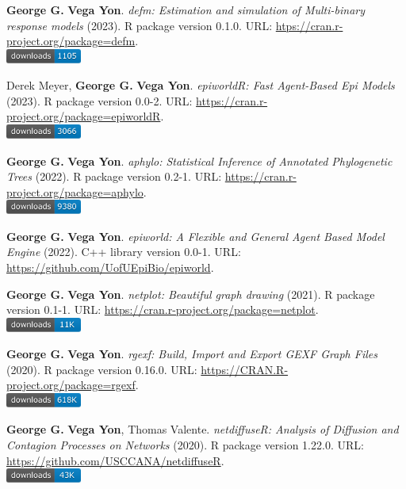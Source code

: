 \item \textbf{George G.} \textbf{Vega Yon}. \textit{defm: Estimation and simulation of Multi-binary response models} (2023). R package version 0.1.0. {\small URL}: \url{htps://cran.r-project.org/package=defm}. \\\includegraphics[width=2.5cm]{fig/cran-downloads-defm.pdf} 
\item Derek Meyer, \textbf{George G.} \textbf{Vega Yon}. \textit{epiworldR: Fast Agent-Based Epi Models} (2023). R package version 0.0-2. {\small URL}: \url{https://cran.r-project.org/package=epiworldR}. \\\includegraphics[width=2.5cm]{fig/cran-downloads-epiworldr.pdf} 
\item \textbf{George G.} \textbf{Vega Yon}. \textit{aphylo: Statistical Inference of Annotated Phylogenetic Trees} (2022). R package version 0.2-1. {\small URL}: \url{https://cran.r-project.org/package=aphylo}. \\\includegraphics[width=2.5cm]{fig/cran-downloads-aphylo.pdf} 
\item \textbf{George G.} \textbf{Vega Yon}. \textit{{epiworld}: A Flexible and General Agent Based Model Engine} (2022). C++ library version 0.0-1. {\small URL}: \url{https://github.com/UofUEpiBio/epiworld}.  
\item \textbf{George G.} \textbf{Vega Yon}. \textit{netplot: Beautiful graph drawing} (2021). R package version 0.1-1. {\small URL}: \url{https://cran.r-project.org/package=netplot}. \\\includegraphics[width=2.5cm]{fig/cran-downloads-netplot.pdf} 
\item \textbf{George G.} \textbf{Vega Yon}. \textit{rgexf: Build, Import and Export GEXF Graph Files} (2020). R package version 0.16.0. {\small URL}: \url{https://CRAN.R-project.org/package=rgexf}. \\\includegraphics[width=2.5cm]{fig/cran-downloads-rgexf.pdf} 
\item \textbf{George G.} \textbf{Vega Yon}, Thomas Valente. \textit{{{netdiffuseR: Analysis of Diffusion and Contagion Processes on Networks}}} (2020). R package version 1.22.0. {\small URL}: \url{https://github.com/USCCANA/netdiffuseR}. \\\includegraphics[width=2.5cm]{fig/cran-downloads-netdiffuser.pdf} 
